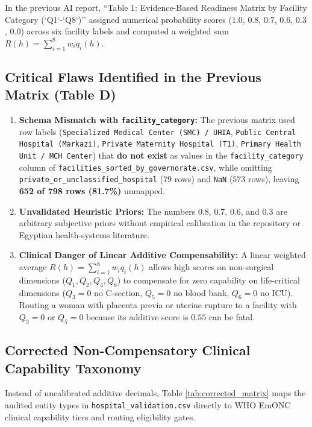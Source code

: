 \documentclass[10pt,a4paper]{article}
\begin{document}
In the previous AI report, ``Table 1: Evidence-Based Readiness Matrix by Facility Category (`Q1`-`Q8`)'' assigned numerical probability scores ($1.0$, $0.8$, $0.7$, $0.6$, $0.3$, $0.0$) across six facility labels and computed a weighted sum $R(h) = \sum_{i=1}^{8} w_i q_i(h)$.

\subsection{Critical Flaws Identified in the Previous Matrix (Table D)}
\begin{enumerate}
    \item \textbf{Schema Mismatch with \texttt{facility\_category}:} The previous matrix used row labels (\texttt{Specialized Medical Center (SMC) / UHIA}, \texttt{Public Central Hospital (Markazi)}, \texttt{Private Maternity Hospital (T1)}, \texttt{Primary Health Unit / MCH Center}) that \textbf{do not exist} as values in the \texttt{facility\_category} column of \texttt{facilities\_sorted\_by\_governorate.csv}, while omitting \texttt{private\_or\_unclassified\_hospital} ($79$ rows) and \texttt{NaN} ($573$ rows), leaving \textbf{652 of 798 rows (81.7\%)} unmapped.
    \item \textbf{Unvalidated Heuristic Priors:} The numbers $0.8$, $0.7$, $0.6$, and $0.3$ are arbitrary subjective priors without empirical calibration in the repository or Egyptian health-systems literature.
    \item \textbf{Clinical Danger of Linear Additive Compensability:} A linear weighted average $R(h) = \sum_{i=1}^{8} w_i q_i(h)$ allows high scores on non-surgical dimensions ($Q_1, Q_2, Q_4, Q_8$) to compensate for zero capability on life-critical dimensions ($Q_3 = 0$ no C-section, $Q_5 = 0$ no blood bank, $Q_6 = 0$ no ICU). Routing a woman with placenta previa or uterine rupture to a facility with $Q_3 = 0$ or $Q_5 = 0$ because its additive score is $0.55$ can be fatal.
\end{enumerate}

\subsection{Corrected Non-Compensatory Clinical Capability Taxonomy}
Instead of uncalibrated additive decimals, Table \ref{tab:corrected_matrix} maps the audited entity types in \texttt{hospital\_validation.csv} directly to WHO EmONC clinical capability tiers and routing eligibility gates.
\end{document}
